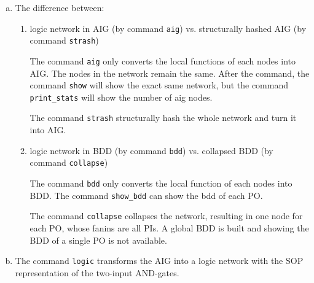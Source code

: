 \documentclass{article}
\begin{document}
    \begin{enumerate}[(a)]
        \item The difference between:
            \begin{enumerate}[1.]
                \item logic network in AIG (by command \texttt{aig}) vs. structurally hashed AIG (by command \texttt{strash})

                    The command \texttt{aig} only converts the local functions of each nodes into AIG. 
                    The nodes in the network remain the same. 
                    After the command, the command \texttt{show} will show the exact same network,
                    but the command \texttt{print\_stats} will show the number of aig nodes.

                    The command \texttt{strash} structurally hash the whole network and turn it into AIG.

                \item logic network in BDD (by command \texttt{bdd}) vs. collapsed BDD (by command \texttt{collapse}) 

                    The command \texttt{bdd} only converts the local function of each nodes into BDD.
                    The command \texttt{show\_bdd} can show the bdd of each PO.

                    The command \texttt{collapse} collapses the network,
                    resulting in one node for each PO, whose fanins are all PIs.
                    A global BDD is built and showing the BDD of a single PO is not available.

            \end{enumerate}
        \item The command \texttt{logic} transforms the AIG into a logic network with the SOP representation of the two-input AND-gates.
    \end{enumerate}
        
        
    
\end{document}
